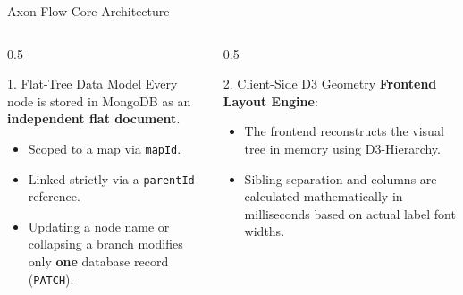 \documentclass[aspectratio=169, 10pt]{beamer}
\begin{document}
\begin{frame}{Axon Flow Core Architecture}
  \begin{columns}
    \begin{column}{0.5\textwidth}
      \begin{block}{1. Flat-Tree Data Model}
        Every node is stored in MongoDB as an \textbf{independent flat document}. 
        \begin{itemize}
          \item[\checkmark] Scoped to a map via \texttt{mapId}.
          \item[\checkmark] Linked strictly via a \texttt{parentId} reference.
          \item[\checkmark] Updating a node name or collapsing a branch modifies only \textbf{one} database record (\texttt{PATCH}).
        \end{itemize}
      \end{block}
    \end{column}
    \begin{column}{0.5\textwidth}
      \begin{block}{2. Client-Side D3 Geometry}
        \textbf{Frontend Layout Engine}:
        \begin{itemize}
          \item[\checkmark] The frontend reconstructs the visual tree in memory using D3-Hierarchy.
          \item[\checkmark] Sibling separation and columns are calculated mathematically in milliseconds based on actual label font widths.
        \end{itemize}
      \end{block}
    \end{column}
  \end{columns}
\end{frame}
\end{document}
